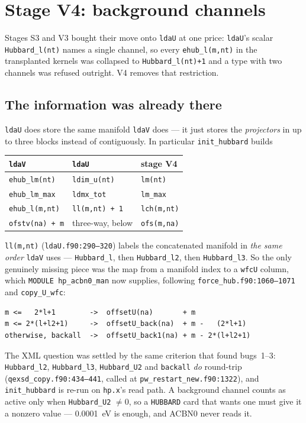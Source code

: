 \documentclass[11pt,a4paper]{article}
\newcommand{\C}[1]{\texttt{\small #1}}
\begin{document}
\section{Stage V4: background channels}\label{sec:v4}

Stages S3 and V3 bought their move onto \C{ldaU} at one price: \C{ldaU}'s
scalar \C{Hubbard_l(nt)} names a single channel, so every \C{ehub_l(m,nt)} in
the transplanted kernels was collapsed to \C{Hubbard_l(nt)+1} and a type with
two channels was refused outright. V4 removes that restriction.

\subsection{The information was already there}

\C{ldaU} does store the same manifold \C{ldaV} does --- it just stores the
\emph{projectors} in up to three blocks instead of contiguously. In
particular \C{init_hubbard} builds

\begin{center}\small
\begin{tabular}{lll}
\toprule
\C{ldaV} & \C{ldaU} & stage V4 \\
\midrule
\C{ehub_lm(nt)}   & \C{ldim_u(nt)}   & \C{lm(nt)} \\
\C{ehub_lm_max}   & \C{ldmx_tot}     & \C{lm_max} \\
\C{ehub_l(m,nt)}  & \C{ll(m,nt) + 1} & \C{lch(m,nt)} \\
\C{ofstv(na) + m} & three-way, below & \C{ofs(m,na)} \\
\bottomrule
\end{tabular}
\end{center}

\noindent
\C{ll(m,nt)} (\C{ldaU.f90:290--320}) labels the concatenated manifold in
\emph{the same order} \C{ldaV} uses --- \C{Hubbard_l}, then \C{Hubbard_l2},
then \C{Hubbard_l3}. So the only genuinely missing piece was the map from a
manifold index to a \C{wfcU} column, which \C{MODULE hp_acbn0_man} now
supplies, following \C{force_hub.f90:1060--1071} and \C{copy_U_wfc}:

\begin{lstlisting}
m <=   2*l+1        ->  offsetU(na)       + m
m <= 2*(l+l2+1)     ->  offsetU_back(na)  + m -   (2*l+1)
otherwise, backall  ->  offsetU_back1(na) + m - 2*(l+l2+1)
\end{lstlisting}

\noindent
The XML question was settled by the same criterion that found bugs~1--3:
\C{Hubbard_l2}, \C{Hubbard_l3}, \C{Hubbard_U2} and \C{backall} \emph{do}
round-trip (\C{qexsd_copy.f90:434--441}, called at
\C{pw_restart_new.f90:1322}), and \C{init_hubbard} is re-run on \C{hp.x}'s
read path. A background channel counts as active only when
\C{Hubbard_U2} $\neq 0$, so a \C{HUBBARD} card that wants one must give it a
nonzero value --- 0.0001~eV is enough, and ACBN0 never reads it.
\end{document}
